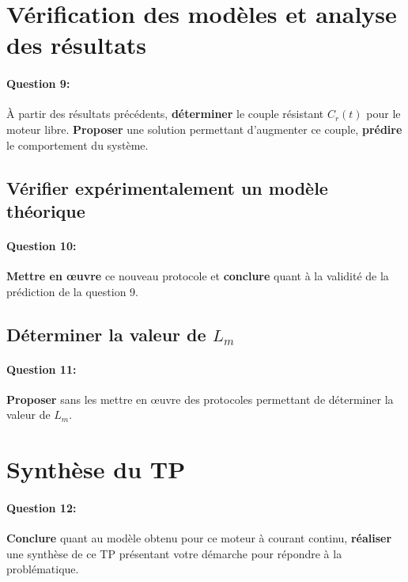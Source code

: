 \section{Vérification des modèles et analyse des résultats}

\paragraph{Question 9:} À partir des résultats précédents, \textbf{déterminer} le couple résistant $C_r(t)$ pour le moteur libre. \textbf{Proposer} une solution permettant d'augmenter ce couple, \textbf{prédire} le comportement du système.

\subsection{Vérifier expérimentalement un modèle théorique}

\paragraph{Question 10:} \textbf{Mettre en \oe uvre} ce nouveau protocole et \textbf{conclure} quant à la validité de la prédiction de la question 9.

\subsection{Déterminer la valeur de $L_m$}

\paragraph{Question 11:} \textbf{Proposer} sans les mettre en \oe uvre des protocoles permettant de déterminer la valeur de $L_m$.

\section{Synthèse du TP}

\paragraph{Question 12:} \textbf{Conclure} quant au modèle obtenu pour ce moteur à courant continu, \textbf{réaliser} une synthèse de ce TP présentant votre démarche pour répondre à la problématique.

\ifdef{\public}{}{}

\clearpage

